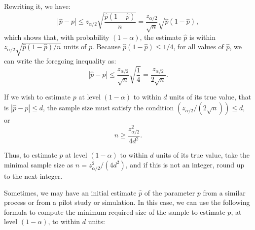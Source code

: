 Rewriting it, we have:
\[
|\hat{p} - p| \leq z_{\alpha/2}\sqrt{\frac{\hat{p}(1-\hat{p})}{n}} = \frac{z_{\alpha/2}}{\sqrt{n}}\sqrt{\hat{p}(1-\hat{p})},
\]
which shows that, with probability $(1-\alpha)$, the estimate $\hat{p}$ is within $z_{\alpha/2}\sqrt{\hat{p}(1-\hat{p})/n}$ units of $p$. Because $\hat{p}(1-\hat{p}) \leq 1/4$, for all values of $\hat{p}$, we can write the foregoing inequality as:
\[
|\hat{p} - p| \leq \frac{z_{\alpha/2}}{\sqrt{n}}\sqrt{\frac{1}{4}} = \frac{z_{\alpha/2}}{2\sqrt{n}}.
\]

If we wish to estimate $p$ at level $(1-\alpha)$ to within $d$ units of its true value, that is $|\hat{p} - p| \leq d$, the sample size must satisfy the condition $(z_{\alpha/2}/(2\sqrt{n})) \leq d$, or
\[
n \geq \frac{z_{\alpha/2}^2}{4d^2}.
\]

Thus, to estimate $p$ at level $(1-\alpha)$ to within $d$ units of its true value, take the minimal sample size as $n = z_{\alpha/2}^2/(4d^2)$, and if this is not an integer, round up to the next integer.

Sometimes, we may have an initial estimate $\hat{p}$ of the parameter $p$ from a similar process or from a pilot study or simulation. In this case, we can use the following formula to compute the minimum required size of the sample to estimate $p$, at level $(1-\alpha)$, to within $d$ units:
